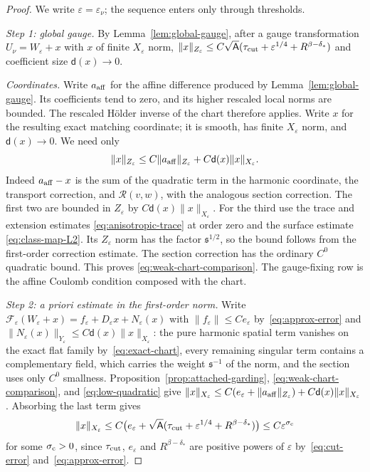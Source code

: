 \documentclass[11pt]{amsart}
\theoremstyle{definition}
\theoremstyle{remark}
\theoremstyle{plain}
\numberwithin{equation}{section}
\newcommand{\eps}{\varepsilon}
\begin{document}
\begin{proof}
We write $\eps=\eps_\nu$; the sequence enters only through thresholds.

\emph{Step 1: global gauge.} By Lemma~\ref{lem:global-gauge}, after a gauge
transformation $U_\nu=W_\eps+x$ with $x$ of finite $X_\eps$ norm,
$\|x\|_{Z_\eps}\le C\sqrt{\mathsf A}(\tau_{\rm cut}+\eps^{1/4}+R^{\beta-\delta_*})$ and coefficient size
$\mathsf d(x)\to0$.

\emph{Coordinates.} Write $a_{\rm aff}$ for the affine difference
produced by Lemma~\ref{lem:global-gauge}. Its coefficients tend to
zero, and its higher rescaled local norms are bounded. The rescaled
H\"older inverse of the chart therefore applies. Write $x$ for the
resulting exact matching coordinate; it is smooth, has finite
$X_\eps$ norm, and $\mathsf d(x)\to0$. We need only
\begin{equation}\label{eq:weak-chart-comparison}
\|x\|_{Z_\eps}\le C\|a_{\rm aff}\|_{Z_\eps}
                     +C\mathsf d(x)\|x\|_{X_\eps}.
\end{equation}
Indeed $a_{\rm aff}-x$ is the sum of the quadratic term in the harmonic coordinate,
the transport correction, and $\mathcal R(v,w)$, with the analogous
section correction. The first two are bounded in $Z_\eps$ by
$C\mathsf d(x)\|x\|_{X_\eps}$. For the third use the trace and
extension estimates \eqref{eq:anisotropic-trace} at order zero and
the surface estimate \eqref{eq:class-map-L2}. Its $Z_\eps$ norm
has the factor ${\mathfrak s}^{1/2}$, so the bound follows from the
first-order correction estimate. The section correction has the
ordinary $C^0$ quadratic bound. This proves
\eqref{eq:weak-chart-comparison}.
The gauge-fixing row is the affine Coulomb condition composed with
the chart.

\emph{Step 2: a priori estimate in the first-order norm.} Write
$\mathcal F_\eps(W_\eps+x)=f_\eps+D_\eps x+N_\eps(x)$ with $\|f_\eps\|\le Ce_\eps$
by~\eqref{eq:approx-error} and $\|N_\eps(x)\|_{Y_\eps}\le C\mathsf d(x)\|x\|_{X_\eps}$:
the pure harmonic spatial term vanishes on the exact flat family
by~\eqref{eq:exact-chart}, every remaining singular term contains a
complementary field, which carries the weight ${\mathfrak s}^{-1}$ of the norm, and the section uses only
$C^0$ smallness. Proposition~\ref{prop:attached-garding},
\eqref{eq:weak-chart-comparison}, and \eqref{eq:low-quadratic} give
$\|x\|_{X_\eps}\le C(e_\eps+\|a_{\rm aff}\|_{Z_\eps})+
C\mathsf d(x)\|x\|_{X_\eps}$. Absorbing the last term gives
\[
\|x\|_{X_\eps}\le C\bigl(e_\eps+\sqrt{\mathsf A}(\tau_{\rm cut}+\eps^{1/4}+R^{\beta-\delta_*})\bigr)
\le C\eps^{\sigma_{\rm c}}
\]
for some $\sigma_{\rm c}>0$, since $\tau_{\rm cut}$, $e_\eps$ and $R^{\beta-\delta_*}$ are positive powers of
$\eps$ by~\eqref{eq:cut-error} and~\eqref{eq:approx-error}.


\end{proof}
\end{document}
